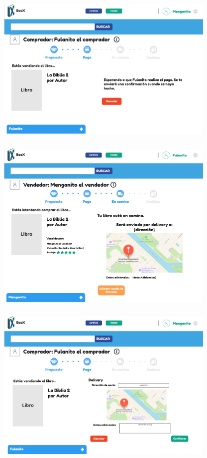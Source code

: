     \subsubsection*{}
    \begin{center}
    \includegraphics[width=300pt]{img/mockups/Huascar Retrieval Team - Vendedor siendo contactado (3).jpg}
    \end{center}
    \subsubsection*{}
    \begin{center}
    \includegraphics[width=300pt]{img/mockups/Huascar Retrieval Team - Contactar vendedor - En camino.jpg}
    \end{center}
    \subsubsection*{}
    \begin{center}
    \includegraphics[width=300pt]{img/mockups/Huascar Retrieval Team - Vendedor siendo contactado (4).jpg}
\end{center}


